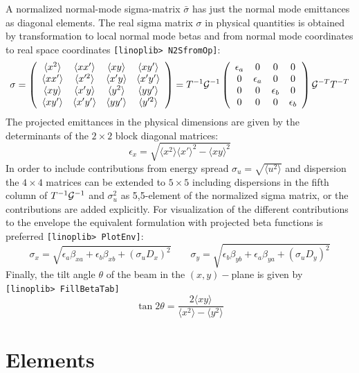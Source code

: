 \documentclass[12pt]{article}
\newcommand\beq{\begin{equation}}
\newcommand\eeq{\end{equation}}
\newcommand\code[1]{{\tt [#1]}}
\begin{document}
A normalized normal-mode sigma-matrix $\bar{\sigma}$ has just the normal mode emittances as diagonal elements. The real sigma matrix $\sigma$ in physical quantities is obtained by transformation to local normal mode betas and from normal mode coordinates to real space coordinates \code{linoplib> N2SfromOp}:
\beq
\sigma = \left(\begin{array}{cccc}
\langle x^2 \rangle & \langle xx' \rangle & \langle xy \rangle & \langle xy' \rangle \\
\langle xx' \rangle & \langle x'^2 \rangle & \langle x'y \rangle & \langle x'y' \rangle \\
\langle xy \rangle & \langle x'y \rangle & \langle y^2 \rangle & \langle yy' \rangle \\
\langle xy' \rangle & \langle x'y' \rangle & \langle yy' \rangle & \langle y'^2 \rangle
\end{array}\right)
=
T^{-1} {\cal G}^{-1}
\left(\begin{array}{cccc}
\epsilon_a & 0 & 0 & 0 \\
0 & \epsilon_a & 0 & 0 \\
0 & 0 & \epsilon_b & 0 \\
0 & 0 & 0 & \epsilon_b
\end{array}\right) {\cal G}^{-T} T^{-T}
\eeq
The projected emittances in the physical dimensions are given by the determinants of the $2\times 2$ block diagonal matrices:
\beq
\epsilon_x = \sqrt{\langle x^2 \rangle \langle x'\rangle^2- \langle xy \rangle^2}
\eeq
In order to include contributions from energy spread $\sigma_u=\sqrt{\langle u^2 \rangle}$ and dispersion the $4\times 4$ matrices can be extended to $5\times 5$ including dispersions in the fifth column of $T^{-1} {\cal G}^{-1}$ and $\sigma_u^2$ as 5,5-element of the normalized sigma matrix, or the contributions are added explicitly. For visualization of the different contributions to the envelope the equivalent formulation with projected beta functions is preferred \code{linoplib> PlotEnv}:
\beq
\sigma_x=\sqrt{\epsilon_a \beta_{xa} + \epsilon_b \beta_{xb} + (\sigma_u D_x)^2} \qquad
\sigma_y=\sqrt{\epsilon_b \beta_{yb} + \epsilon_a \beta_{ya} + (\sigma_u D_y)^2}
\eeq
Finally, the tilt angle $\theta$ of the beam in the $(x,y)-$plane is given by \code{linoplib> FillBetaTab}
\beq
\tan 2\theta =\frac{ 2 \langle xy \rangle}{\langle x^2 \rangle - \langle y^2 \rangle}
\eeq

\section{Elements}
\end{document}
